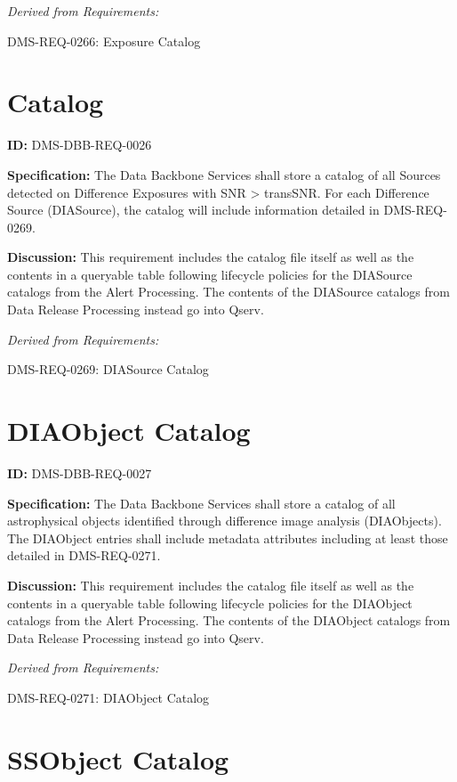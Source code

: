 \documentclass[SE,toc,lsstdraft]{lsstdoc}
\begin{document}
\emph{Derived from Requirements:}

DMS-REQ-0266:
Exposure Catalog \newline

\section{Catalog}

\label{DMS-DBB-REQ-0026}
\textbf{ID:} DMS-DBB-REQ-0026

\textbf{Specification:}
The Data Backbone Services shall store a catalog of all Sources detected on Difference Exposures with SNR > transSNR.   For each Difference Source (DIASource), the catalog will include information detailed in DMS-REQ-0269.

\textbf{Discussion:}
This requirement includes the catalog file itself as well as the contents in a queryable table following lifecycle policies for the DIASource catalogs from the Alert Processing.  The contents of the DIASource catalogs from Data Release Processing instead go into Qserv.

\emph{Derived from Requirements:}

DMS-REQ-0269:
DIASource Catalog \newline

\section{DIAObject Catalog}

\label{DMS-DBB-REQ-0027}
\textbf{ID:} DMS-DBB-REQ-0027

\textbf{Specification:}
The Data Backbone Services shall store a catalog of all astrophysical objects identified through difference image analysis (DIAObjects). The DIAObject entries shall include metadata attributes including at least those detailed in DMS-REQ-0271.

\textbf{Discussion:}
This requirement includes the catalog file itself as well as the contents in a queryable table following lifecycle policies for the DIAObject catalogs from the Alert Processing.  The contents of the DIAObject catalogs from Data Release Processing instead go into Qserv.

\emph{Derived from Requirements:}

DMS-REQ-0271:
DIAObject Catalog \newline

\section{SSObject Catalog}
\end{document}
